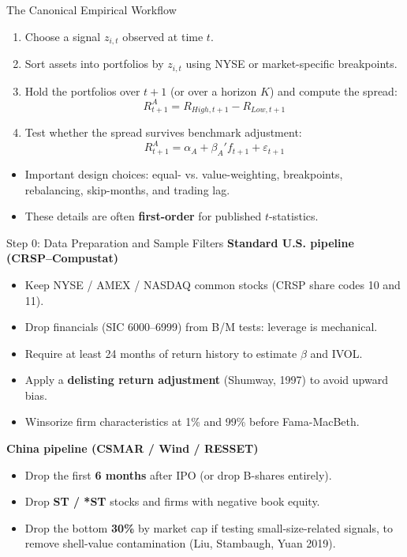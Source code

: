 \documentclass{beamer}
\begin{document}
\begin{frame}{The Canonical Empirical Workflow}
	\begin{enumerate}
		\item Choose a signal $z_{i,t}$ observed at time $t$.
		\item Sort assets into portfolios by $z_{i,t}$ using NYSE or market-specific breakpoints.
		\item Hold the portfolios over $t+1$ (or over a horizon $K$) and compute the spread:
		\begin{equation}
			R^{A}_{t+1} = R_{High,t+1} - R_{Low,t+1}
		\end{equation}
		\item Test whether the spread survives benchmark adjustment:
		\begin{equation}
			R^{A}_{t+1} = \alpha_A + \beta_A' f_{t+1} + \varepsilon_{t+1}
		\end{equation}
	\end{enumerate}

	\begin{itemize}
		\item Important design choices: equal- vs. value-weighting, breakpoints, rebalancing, skip-months, and trading lag.
		\item These details are often \textbf{first-order} for published $t$-statistics.
	\end{itemize}
\end{frame}

\begin{frame}{Step 0: Data Preparation and Sample Filters}
	\textbf{Standard U.S. pipeline (CRSP--Compustat)}
	\begin{itemize}
		\item Keep NYSE / AMEX / NASDAQ common stocks (CRSP share codes 10 and 11).
		\item Drop financials (SIC 6000--6999) from B/M tests: leverage is mechanical.
		\item Require at least 24 months of return history to estimate $\beta$ and IVOL.
		\item Apply a \textbf{delisting return adjustment} (Shumway, 1997) to avoid upward bias.
		\item Winsorize firm characteristics at 1\% and 99\% before Fama-MacBeth.
	\end{itemize}

	\textbf{China pipeline (CSMAR / Wind / RESSET)}
	\begin{itemize}
		\item Drop the first \textbf{6 months} after IPO (or drop B-shares entirely).
		\item Drop \textbf{ST / *ST} stocks and firms with negative book equity.
		\item Drop the bottom \textbf{30\%} by market cap if testing small-size-related signals, to remove shell-value contamination (Liu, Stambaugh, Yuan 2019).
	\end{itemize}
\end{frame}
\end{document}

